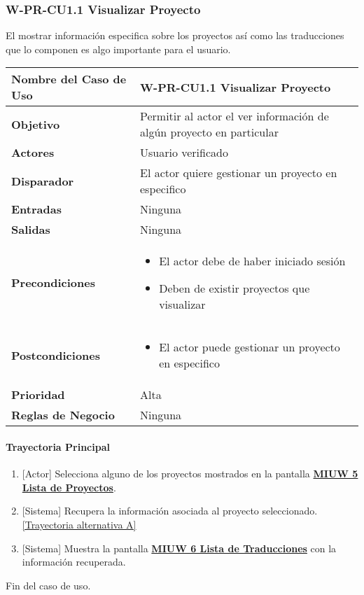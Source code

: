 \subsubsection{W-PR-CU1.1 Visualizar Proyecto}
El mostrar información especifica sobre los proyectos así como las traducciones que lo componen es algo importante para el usuario.
\begin{longtable}{|J{5cm}|J{10.3cm}|}
	\hline
	\textbf{Nombre del Caso de Uso} &
		W-PR-CU1.1 Visualizar Proyecto \\ \hline
	\textbf{Objetivo} &
		Permitir al actor el ver información de algún proyecto en particular \\ \hline
	\textbf{Actores} &
		Usuario verificado \\ \hline 
	\textbf{Disparador} & 
		El actor quiere gestionar un proyecto en especifico \\ \hline 
	\textbf{Entradas} & 
		Ninguna \\ \hline 
	\textbf{Salidas} & 
		Ninguna \\ \hline
	\textbf{Precondiciones} &
		\begin{itemize}
				\item El actor debe de haber iniciado sesión
				\item Deben de existir proyectos que visualizar
		\end{itemize} \\ \hline
	\textbf{Postcondiciones} &
		\begin{itemize}
			\item El actor puede gestionar un proyecto en especifico
		\end{itemize}\\ \hline
	\textbf{Prioridad} & 
		Alta \\ \hline
	\textbf{Reglas de Negocio} & 
		Ninguna \\ \hline

\end{longtable}
\paragraph{Trayectoria Principal}
	\begin{enumerate}
	    \item {[Actor]} Selecciona alguno de los proyectos mostrados en la pantalla \hyperref[fig:MIUW-5]{\bf MIUW 5 Lista de Proyectos}.
	    \item {[Sistema]} Recupera la información asociada al proyecto seleccionado. \hyperref[W-PR-CU1.1:TA]{[Trayectoria alternativa A]}
	    \item {[Sistema]} Muestra la pantalla \hyperref[fig:MIUW-6]{\bf MIUW 6 Lista de Traducciones} con la información recuperada.
	\end{enumerate}
	Fin del caso de uso.

